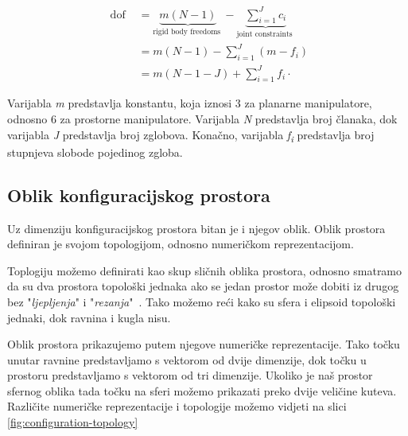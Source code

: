 \documentclass[times, utf8, diplomskirad]{fer}
\begin{document}
\begin{equation}
    \begin{aligned}
        \text { dof } &=\underbrace{m(N-1)}_{\text {rigid body freedoms }}-\underbrace{\sum_{i=1}^{J} c_{i}}_{\text {joint constraints }} \\
        &=m(N-1)-\sum_{i=1}^{J}\left(m-f_{i}\right) \\
        &=m(N-1-J)+\sum_{i=1}^{J} f_{i} \cdot
    \end{aligned}
    \label{eq:grubler}
\end{equation}

Varijabla \textit{m} predstavlja konstantu, koja iznosi 3 za planarne manipulatore, odnosno 6 za prostorne manipulatore.
Varijabla \textit{N} predstavlja broj članaka, dok varijabla \textit{J} predstavlja broj zglobova.
Konačno, varijabla \textit{f\textsubscript{i}} predstavlja broj stupnjeva slobode pojedinog zgloba.

\subsection{Oblik konfiguracijskog prostora}
Uz dimenziju konfiguracijskog prostora bitan je i njegov oblik.
Oblik prostora definiran je svojom topologijom, odnosno numeričkom reprezentacijom.

Toplogiju možemo definirati kao skup sličnih oblika prostora, odnosno smatramo da su dva prostora topološki jednaka
ako se jedan prostor može dobiti iz drugog bez "\textit{ljepljenja}" i "\textit{rezanja}"~\cite{10.5555/3165183}.
Tako možemo reći kako su sfera i elipsoid topološki jednaki, dok ravnina i kugla nisu.

Oblik prostora prikazujemo putem njegove numeričke reprezentacije.
Tako točku unutar ravnine predstavljamo s vektorom od dvije dimenzije, dok točku u prostoru predstavljamo s vektorom od tri dimenzije.
Ukoliko je naš prostor sfernog oblika tada točku na sferi možemo prikazati preko dvije veličine kuteva.
Različite numeričke reprezentacije i topologije možemo vidjeti na slici \ref{fig:configuration-topology}
\end{document}
